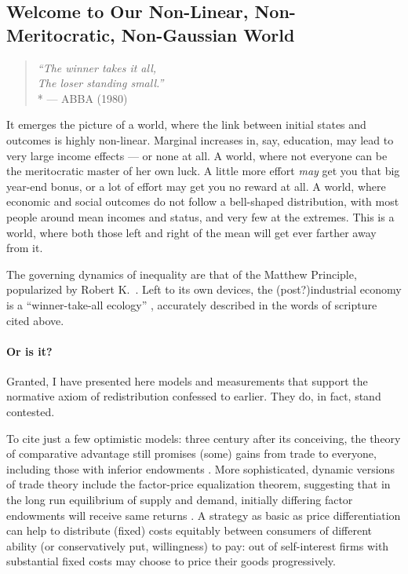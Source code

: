 \subsection[Our Non-Linear/Meritocratic/Gaussian World]{Welcome to Our Non-Linear, Non-Meritocratic, Non-Gaussian World}

\begin{verse}
	\emph{``The winner takes it all,\\
	The loser standing small.''}
	\\*
	--- ABBA (1980)
\end{verse}

It emerges the picture of a world, where the link between initial states and outcomes is highly non-linear.
Marginal increases in, say, education, may lead to very large income effects --- or none at all.
A world, where not everyone can be the meritocratic master of her own luck.
A little more effort \emph{may} get you that big year-end bonus, or a lot of effort may get you no reward at all.
A world, where economic and social outcomes do not follow a bell-shaped distribution, with most people around mean incomes and status, and very few at the extremes.
This is a world, where both those left and right of the mean will get ever farther away from it.

The governing dynamics of inequality are that of the Matthew Principle, popularized by Robert K.~\cite{Merton1988, Jackson1968}.
Left to its own devices, the (post?)industrial economy is a ``winner-take-all ecology'' \citep{Taleb2007}, accurately described in the words of scripture cited above.

\paragraph{Or is it?} Granted, I have presented here models and measurements that support the normative axiom of redistribution confessed to earlier.
They do, in fact, stand contested.

To cite just a few optimistic models:
three century after its conceiving, the theory of comparative advantage still promises (some) gains from trade to everyone, including those with inferior endowments \citep{Ricardo1817}.
More sophisticated, dynamic versions of trade theory include the factor-price equalization theorem, suggesting that in the long run equilibrium of supply and demand, initially differing factor endowments will receive same returns \citep{Stolper1941}.
A strategy as basic as price differentiation can help to distribute (fixed) costs equitably between consumers of different ability (or conservatively put, willingness) to pay:
out of self-interest firms with substantial fixed costs may choose to price their goods progressively.

